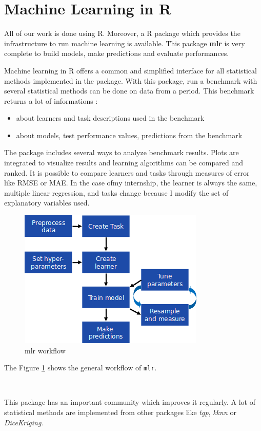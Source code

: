 \documentclass[12pt,twoside]{reedthesis}
\providecommand{\tightlist}{%
  \setlength{\itemsep}{0pt}\setlength{\parskip}{0pt}}
\theoremstyle{definition}
\theoremstyle{definition}
\theoremstyle{definition}
\theoremstyle{remark}
\begin{document}
\section{Machine Learning in R}\label{machine-learning-in-r}

All of our work is done using R. Moreover, a R package which provides
the infrastructure to run machine learning is available. This package
\textbf{mlr} is very complete to build models, make predictions and
evaluate performances.

Machine learning in R offers a common and simplified interface for all
statistical methods implemented in the package. With this package, run a
benchmark with several statistical methods can be done on data from a
period. This benchmark returns a lot of informations :
\begin{itemize}
\tightlist
\item
  about learners and task descriptions used in the benchmark
\item
  about models, test performance values, predictions from the benchmark
\end{itemize}
The package includes several ways to analyze benchmark results. Plots
are integrated to visualize results and learning algorithms can be
compared and ranked. It is possible to compare learners and tasks
through measures of error like RMSE or MAE. In the case ofmy internship,
the learner is always the same, multiple linear regression, and tasks
change because I modify the set of explanatory variables used.
\begin{figure}

{\centering \includegraphics[width=0.5\linewidth]{figure/mlr_workflow} 

}

\caption{mlr workflow}\label{fig:mlr}
\end{figure}
The Figure \ref{fig:mlr} shows the general workflow of \texttt{mlr}.

~

This package has an important community which improves it regularly. A
lot of statistical methods are implemented from other packages like
\emph{tgp}, \emph{kknn} or \emph{DiceKriging}.
\end{document}
